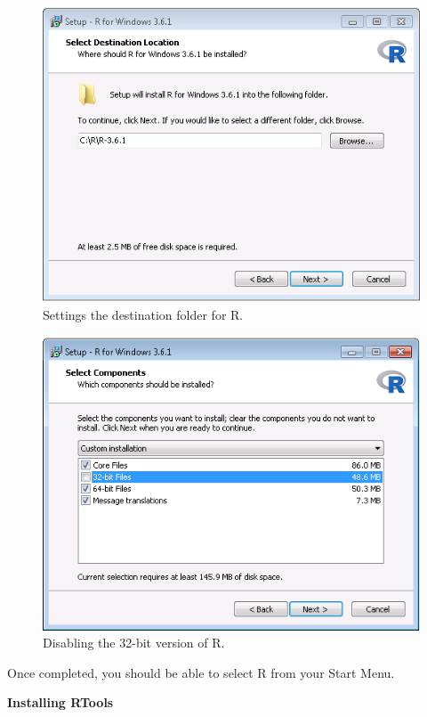 \documentclass[11pt]{book}
\theoremstyle{definition}
\theoremstyle{definition}
\theoremstyle{definition}
\theoremstyle{remark}
\begin{document}
\begin{figure}

{\centering \includegraphics[width=0.8\linewidth]{images/OhdsiAnalyticsTools/rDestination} 

}

\caption{Settings the destination folder for R.}\label{fig:rDestination}
\end{figure}

\begin{figure}

{\centering \includegraphics[width=0.8\linewidth]{images/OhdsiAnalyticsTools/no32Bits} 

}

\caption{Disabling the 32-bit version of R.}\label{fig:no32Bits}
\end{figure}

Once completed, you should be able to select R from your Start Menu.

\textbf{Installing RTools}
\end{document}
